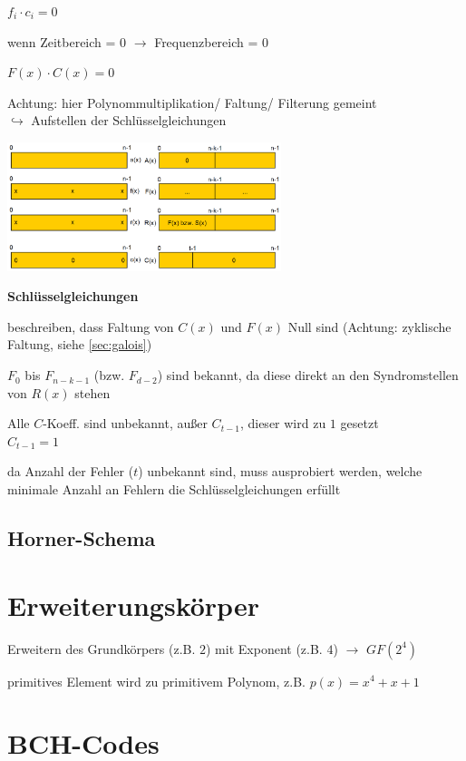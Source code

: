 $\displaystyle{
    f_i \cdot c_i = 0
}$

wenn Zeitbereich = 0 $\rightarrow$ Frequenzbereich = 0

$\displaystyle{
    F(x) \cdot C(x) = 0
}$

Achtung: hier Polynommultiplikation/ Faltung/ Filterung gemeint\\
$\hookrightarrow$ Aufstellen der Schlüsselgleichungen

\includegraphics[width=8cm]{img/decod_rs.PNG}

\textbf{Schlüsselgleichungen}

beschreiben, dass Faltung von $C(x)$ und $F(x)$ Null sind (Achtung: zyklische Faltung, siehe \autoref{sec:galois})

$F_0$ bis $F_{n-k-1}$ (bzw. $F_{d-2}$) sind bekannt, da diese direkt an den Syndromstellen
von $R(x)$ stehen

Alle $C$-Koeff. sind unbekannt, außer $C_{t-1}$, dieser wird zu $1$ gesetzt\\

$\displaystyle{
    C_{t-1} = 1
}$

da Anzahl der Fehler ($t$) unbekannt sind, muss ausprobiert werden, welche minimale Anzahl an Fehlern
die Schlüsselgleichungen erfüllt



\subsection{Horner-Schema}

\section{Erweiterungskörper}

Erweitern des Grundkörpers (z.B. $2$) mit Exponent (z.B. $4$) $\rightarrow$
$GF(2^4)$

primitives Element wird zu primitivem Polynom, z.B.
$\displaystyle{
    p(x) = x^4 + x + 1
}$

\section{BCH-Codes}

